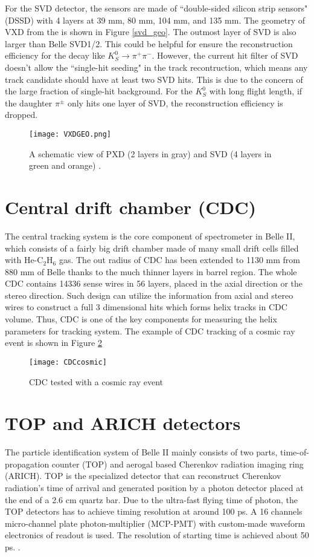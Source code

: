 For the SVD detector, the sensors are made of ``double-sided silicon strip sensors" (DSSD) with 4 layers at 39 mm, 80 mm, 104 mm, and 135 mm. The geometry of VXD from the is shown in Figure \ref{svd_geo}. The outmost layer of SVD is also larger than Belle SVD1/2. This could be helpful for ensure the reconstruction efficiency for the decay like $K_S^0 \to \pi^+ \pi^- $. However, the current hit filter of SVD doesn't allow the ``single-hit seeding" in the track recontruction, which means any track candidate should have at least two SVD hits. This is due to the concern of the large fraction of single-hit background. For the $K^0_S$ with long flight length, if the daughter $\pi^{\pm}$ only hits one layer of SVD, the reconstruction efficiency is dropped. 
\begin{figure}[H]
	\centering
	\texttt{[image: VXDGEO.png]}
	\caption{A schematic view of PXD (2 layers in gray) and SVD (4 layers in green and orange) \cite{Abe:2010gxa}.}
	\label{fig:svdgeo}
\end{figure}



\section{Central drift chamber (CDC)}
The central tracking system is the core component of spectrometer in Belle II, which consists of a fairly big drift chamber made of many small drift cells filled with He-C$_2$H$_6$ gas. The out radius of CDC has been extended to 1130 mm from 880 mm of Belle thanks to the much thinner layers in barrel region. The whole CDC contains 14336 sense wires in 56 layers, placed in the axial direction or the stereo direction. Such design can utilize the information from axial and stereo wires to construct a full 3 dimensional hits which forms helix tracks in CDC volume. Thus, CDC is one of the key components for measuring the helix parameters for tracking system. The example of CDC tracking of a cosmic ray event  is shown in Figure \ref{CDC_cosmic}

\begin{figure}[H]
	\centering
	\texttt{[image: CDCcosmic]}
	\caption{CDC tested with a cosmic ray event \cite{b2book}}
	\label{CDC_cosmic}
\end{figure}


\section{TOP and ARICH detectors}
The particle identification system of Belle II mainly consists of two parts, time-of-propagation counter (TOP) and aerogal based Cherenkov radiation imaging ring (ARICH). TOP is the specialized detector that can reconstruct Cherenkov radiation's time of arrival and generated position by a photon detector placed at the end of a 2.6 cm quartz bar. Due to the ultra-fast flying time of photon, the TOP detectors has to achieve timing resolution at around 100 ps. A 16 channels micro-channel plate photon-multiplier (MCP-PMT) with custom-made waveform electronics of readout is used. The resolution of starting time is achieved about 50 ps. \cite{Abe:2010gxa}. 

